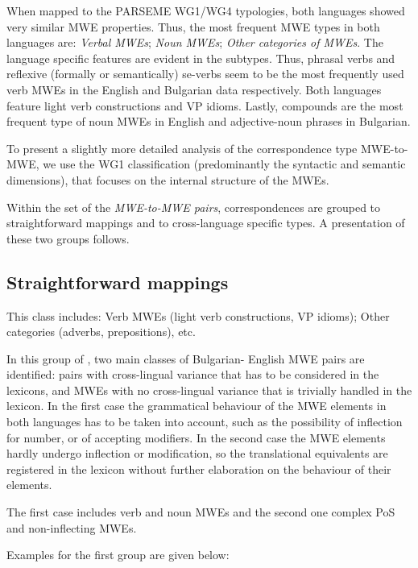 \documentclass[output=paper]{langsci/langscibook}
\begin{document}
When mapped to the PARSEME WG1/WG4 typologies, both languages showed very similar MWE properties. Thus, the most frequent MWE types in both languages
are: {\em Verbal MWEs}; {\em Noun MWEs}; {\em Other categories of MWEs}.
The language specific features are evident in the subtypes. Thus, 
phrasal verbs and reflexive (formally or semantically) se-verbs seem to
be the most frequently used verb MWEs in the English and Bulgarian data
respectively. Both languages feature light verb constructions and VP idioms.
Lastly, compounds are the most frequent type of noun MWEs in English and adjective-noun phrases in Bulgarian. 

To present a slightly more detailed analysis of the correspondence type
MWE-to-MWE, we use the WG1 classification (predominantly the syntactic and
semantic dimensions), that focuses on the internal structure of the MWEs.


Within the set of the {\em MWE-to-MWE pairs}, correspondences are grouped to straightforward mappings and to cross-language specific types. A presentation of these two groups follows. 

\subsection{ Straightforward mappings}

This class includes: Verb MWEs (light verb constructions, VP idioms); Other
categories (adverbs, prepositions), etc.


In this group of , two main classes of Bulgarian- \linebreak English MWE pairs are identified:  pairs with cross-lingual
variance that has to be considered in the lexicons, and MWEs with
no cross-lingual variance that is trivially handled in the lexicon. In the first case the grammatical behaviour of the MWE elements in both languages has to
be taken into account, such as the possibility of inflection for number, or of accepting modifiers. In the second case the MWE elements hardly undergo inflection 
or modification, so the translational equivalents are registered in the lexicon without further elaboration on the behaviour of their elements.
 
The first case includes verb and noun MWEs and the second one complex PoS and
non-inflecting MWEs. 

Examples for the first group are given below:
\end{document}
